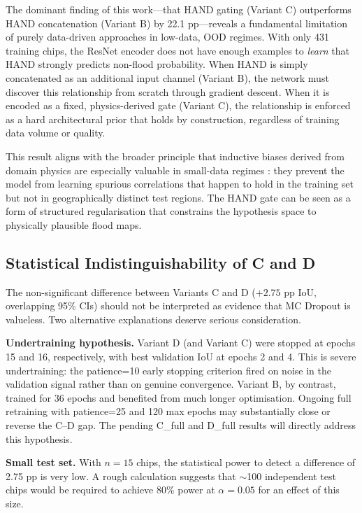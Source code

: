 \documentclass[12pt]{article}
\newcommand{\IoU}{\mathrm{IoU}}
\begin{document}
The dominant finding of this work—that HAND gating (Variant C) outperforms
HAND concatenation (Variant B) by 22.1 pp—reveals a fundamental limitation
of purely data-driven approaches in low-data, OOD regimes.  With only 431
training chips, the ResNet encoder does not have enough examples to
\emph{learn} that HAND strongly predicts non-flood probability.  When HAND
is simply concatenated as an additional input channel (Variant B), the
network must discover this relationship from scratch through gradient
descent.  When it is encoded as a fixed, physics-derived gate
(Variant C), the relationship is enforced as a hard architectural prior
that holds by construction, regardless of training data volume or quality.

This result aligns with the broader principle that inductive biases derived
from domain physics are especially valuable in small-data regimes
\cite{karniadakis2021physics}: they prevent the model from learning
spurious correlations that happen to hold in the training set but not in
geographically distinct test regions.  The HAND gate can be seen as a form
of structured regularisation that constrains the hypothesis space to
physically plausible flood maps.

\subsection{Statistical Indistinguishability of C and D}

The non-significant difference between Variants C and D ($+2.75$ pp
$\IoU$, overlapping 95\% CIs) should not be interpreted as evidence
that MC Dropout is valueless.  Two alternative explanations deserve serious
consideration.

\textbf{Undertraining hypothesis.}  Variant D (and Variant C) were stopped
at epochs 15 and 16, respectively, with best validation IoU at epochs 2 and 4.
This is severe undertraining: the patience=10 early stopping criterion fired
on noise in the validation signal rather than on genuine convergence.
Variant B, by contrast, trained for 36 epochs and benefited from much longer
optimisation.  Ongoing full retraining with patience=25 and 120 max epochs
may substantially close or reverse the C–D gap.  The pending C\_full and
D\_full results will directly address this hypothesis.

\textbf{Small test set.}  With $n=15$ chips, the statistical power to detect
a difference of 2.75 pp is very low.  A rough calculation suggests that
$\sim$100 independent test chips would be required to achieve 80\% power
at $\alpha=0.05$ for an effect of this size.
\end{document}
